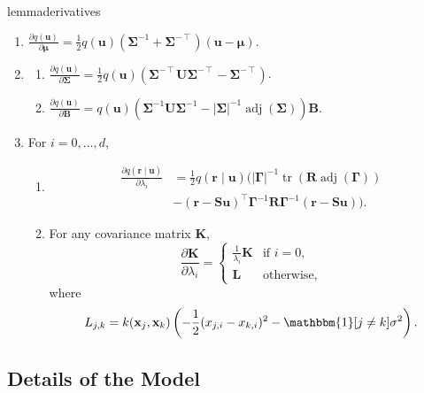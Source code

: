 \documentclass{mpaper}
\DeclareMathOperator{\adj}{adj}
\DeclareMathOperator{\tr}{tr}
\begin{document}
\begin{restatable}{lemma}{derivatives} \label{lemma:derivatives}
  \leavevmode
  \begin{enumerate}
  \item $\frac{\partial q(\mathbf{u})}{\partial \bm\mu} =
    \frac{1}{2}q(\mathbf{u})(\bm\Sigma^{-1} + \bm\Sigma^{-\intercal})(\mathbf{u}
    - \bm\mu)$.
  \item
    \begin{enumerate}
    \item
      $\frac{\partial q(\mathbf{u})}{\partial \bm\Sigma} =
      \frac{1}{2}q(\mathbf{u})(\bm\Sigma^{-\intercal}\mathbf{U}\bm\Sigma^{-\intercal}
      - \bm\Sigma^{-\intercal})$.
    \item
      $\frac{\partial q(\mathbf{u})}{\partial \mathbf{B}} =
      q(\mathbf{u})(\bm\Sigma^{-1}\mathbf{U}\bm\Sigma^{-1} -
      |\bm\Sigma|^{-1}\adj(\bm\Sigma))\mathbf{B}$.
    \end{enumerate}
  \item For $i = 0, \dots, d$,
    \begin{enumerate}
    \item
      \begin{align*}
        \frac{\partial q(\mathbf{r} \mid \mathbf{u})}{\partial \lambda_i} &= \frac{1}{2}q(\mathbf{r} \mid \mathbf{u}) (|\bm\Gamma|^{-1} \tr(\mathbf{R} \adj(\bm\Gamma)) \\
                                                                          &- (\mathbf{r} - \mathbf{Su})^\intercal\bm\Gamma^{-1}\mathbf{R}\bm\Gamma^{-1}(\mathbf{r} - \mathbf{Su})).
      \end{align*}
    \item For any covariance matrix $\mathbf{K}$,
      \[
        \frac{\partial \mathbf{K}}{\partial \lambda_i} =
        \begin{cases}
          \frac{1}{\lambda_i}\mathbf{K} & \text{if } i = 0, \\
          \mathbf{L} & \text{otherwise,}
        \end{cases}
      \]
      where
      \[
        L_{j,k} = k(\mathbf{x}_j, \mathbf{x}_k) \left( -\frac{1}{2}(x_{j,i} -
          x_{k,i})^2 - \mathbbm{1}[j \ne k]\sigma^2 \right).
      \]
    \end{enumerate}
  \end{enumerate}
\end{restatable}

\subsection{Details of the Model} \label{sec:details}
\end{document}
